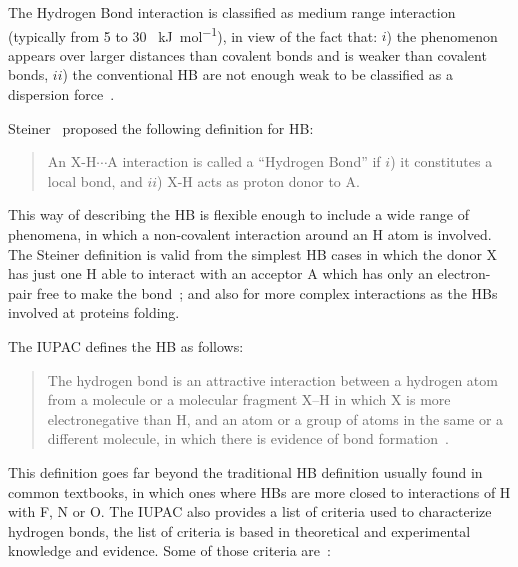 The Hydrogen Bond interaction is classified as medium range interaction
(typically from 5 to 30 \SI{}{\kilo \joule \per \mole}), in view of the fact
that: $i$) the phenomenon appears over larger distances than covalent bonds
and is weaker than covalent bonds, $ii$) the conventional HB are not enough
weak to be classified as a dispersion force~\cite{chang}.

Steiner~\cite{steiner} proposed the following definition for HB:

\begin{quote} 
An X-H$\cdots$A interaction is called a ``Hydrogen Bond'' if $i$) it
constitutes a local bond, and $ii$) X-H acts as proton donor to A.
\end{quote}

\noindent This way of describing the HB is flexible enough to include a wide
range of phenomena, in which a non-covalent interaction around an H atom is
involved. The Steiner definition is valid from the simplest HB cases in which
the donor X has just one H able to interact with an acceptor A which has only
an electron-pair free to make the bond~\cite{scheiner}; and also for more
complex interactions as the HBs involved at proteins folding.

The \gls{IUPAC} defines the HB as follows:

\begin{quote}
The hydrogen bond is an attractive interaction between a hydrogen atom from a
molecule or a molecular fragment X–H in which X is more electronegative than H,
and an atom or a group of atoms in the same or a different molecule, in which
there is evidence of bond formation~\cite{iupac}.
\end{quote}

This definition goes far beyond the traditional HB definition usually found in
common textbooks, in which ones where HBs are more closed to interactions of H
with F, N or O. The IUPAC also provides a list of criteria used to
characterize hydrogen bonds, the list of criteria is based in theoretical and
experimental knowledge and evidence. Some of those criteria are~\citep{iupac}:

